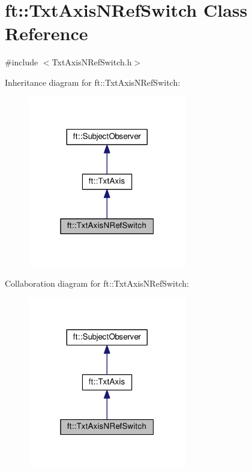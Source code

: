 \hypertarget{classft_1_1_txt_axis_n_ref_switch}{}\section{ft\+:\+:Txt\+Axis\+N\+Ref\+Switch Class Reference}
\label{classft_1_1_txt_axis_n_ref_switch}


{\ttfamily \#include $<$Txt\+Axis\+N\+Ref\+Switch.\+h$>$}



Inheritance diagram for ft\+:\+:Txt\+Axis\+N\+Ref\+Switch\+:
\nopagebreak
\begin{figure}[H]
\begin{center}
\leavevmode
\includegraphics[width=196pt]{classft_1_1_txt_axis_n_ref_switch__inherit__graph}
\end{center}
\end{figure}


Collaboration diagram for ft\+:\+:Txt\+Axis\+N\+Ref\+Switch\+:
\nopagebreak
\begin{figure}[H]
\begin{center}
\leavevmode
\includegraphics[width=196pt]{classft_1_1_txt_axis_n_ref_switch__coll__graph}
\end{center}
\end{figure}

